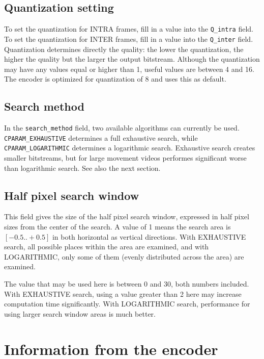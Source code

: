 \documentclass{article}
\begin{document}
\subsection{Quantization setting}

To set the quantization for INTRA frames, fill in a value into the
{\tt Q\_intra} field. To set the quantization for INTER frames, fill
in a value into the {\tt Q\_inter} field. Quantization determines
directly the quality: the lower the quantization, the higher the
quality but the larger the output bitstream. Although the quantization
may have any values equal or higher than 1, useful values are between
4 and 16. The encoder is optimized for quantization of 8 and uses this
as default.

\subsection{Search method}

In the {\tt search\_method} field, two available algorithms can
currently be used. {\tt CPARAM\_EXHAUSTIVE} determines a full
exhaustive search, while {\tt CPARAM\_LOGARITHMIC} determines a
logarithmic search. Exhaustive search creates smaller bitstreams, but
for large movement videos performes significant worse than logarithmic
search. See also the next section.

\subsection{Half pixel search window}

This field gives the size of the half pixel search window, expressed
in half pixel sizes from the center of the search. A value of 1 means
the search area is $[-0.5..+0.5]$ in both horizontal as vertical
directions. With EXHAUSTIVE search, all possible places within the
area are examined, and with LOGARITHMIC, only some of them (evenly
distributed across the area) are examined. 

The value that may be used here is between 0 and 30, both numbers
included. With EXHAUSTIVE search, using a value greater than 2 here
may increase computation time significantly. With LOGARITHMIC search,
performance for using larger search window areas is much better.

\section{Information from the encoder}
\end{document}
